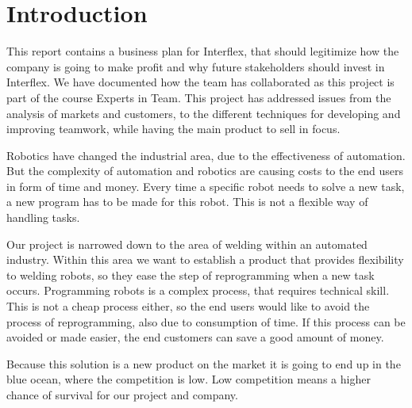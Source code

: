 \section{Introduction}

This report contains a business plan for Interflex, that should legitimize how the company is going to make profit and why future stakeholders should invest in Interflex. 
We have documented how the team has collaborated as this project is part of the course Experts in Team.
This project has addressed issues from the analysis of markets and customers, to the different techniques for developing and improving teamwork, while having the main product to sell in focus.

Robotics have changed the industrial area, due to the effectiveness of automation. But the complexity of automation and robotics are causing costs to the end users in form of time and money. Every time a specific robot needs to solve a new task, a new program has to be made for this robot. This is not a flexible way of handling tasks. 

Our project is narrowed down to the area of welding within an automated industry. Within this area we want to establish a product that provides flexibility to welding robots, so they ease the step of reprogramming when a new task occurs. Programming robots is a complex process, that requires technical skill. This is not a cheap process either, so the end users would like to avoid the process of reprogramming, also due to consumption of time. If this process can be avoided or made easier, the end customers can save a good amount of money. 

Because this solution is a new product on the market it is going to end up in the blue ocean, where the competition is low. Low competition means a higher chance of survival for our project and company. 

